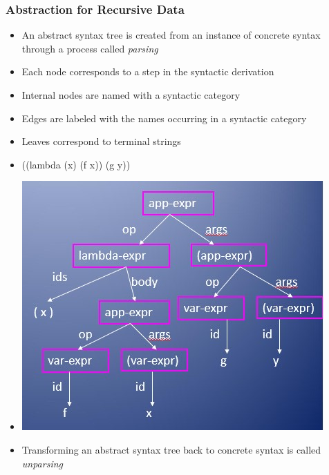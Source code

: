 \documentclass{beamer}
\begin{document}
\begin{frame}[fragile]
\frametitle{Abstraction for Recursive Data}
\begin{scriptsize}
\begin{itemize}
\item<1-> An abstract syntax tree is created from an instance of concrete syntax through a process called \emph{parsing}

\item<1-> Each node corresponds to a step in the syntactic derivation

\item<1-> Internal nodes are named with a syntactic category

\item<1-> Edges are labeled with the names occurring in a syntactic category

\item<1-> Leaves correspond to terminal strings

\item<2-> ((lambda (x) (f x)) (g y))

\item<2->
\begin{center}
\includegraphics[scale=0.8]{lc-parse-tree.jpg}
\end{center}

\item<3-> Transforming an abstract syntax tree back to concrete syntax is called \emph{unparsing}

\end{itemize}
\end{scriptsize}
\end{frame}
\end{document}
